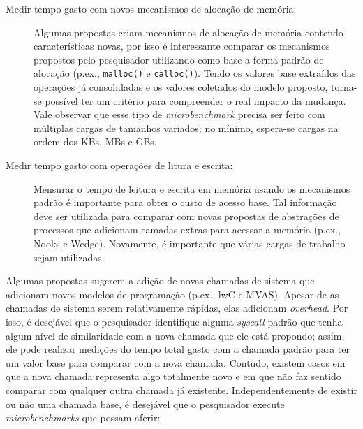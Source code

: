 \begin{description}

  \item[Medir tempo gasto com novos mecanismos de alocação de memória:]

Algumas propostas criam mecanismos de alocação de memória contendo
características novas, por isso é interessante comparar os mecanismos
propostos pelo pesquisador utilizando como base a forma padrão de alocação
(p.ex., \texttt{malloc()} e \texttt{calloc()}). Tendo os valores base extraídos
das operações já consolidadas e os valores coletados do modelo proposto,
torna-se possível ter um critério para compreender o real impacto da mudança.
Vale observar que esse tipo de \emph{microbenchmark} precisa ser feito com
múltiplas cargas de tamanhos variados; no mínimo, espera-se cargas na ordem dos
KBs, MBs e GBs.

  \item[Medir tempo gasto com operações de litura e escrita:]

Mensurar o tempo de leitura e escrita em memória usando os mecanismos
padrão é importante para obter o custo de acesso base. Tal informação deve ser
utilizada para comparar com novas propostas de abstrações de processos que
adicionam camadas extras para acessar a memória (p.ex., Nooks e Wedge).
Novamente, é importante que várias cargas de trabalho sejam utilizadas.

\end{description}

Algumas propostas sugerem a adição de novas chamadas de sistema que adicionam
novos modelos de programação (p.ex., lwC e MVAS). Apesar de as chamadas de sistema
serem relativamente rápidas, elas adicionam \emph{overhead}. Por isso, é
desejável que o pesquisador identifique alguma \emph{syscall} padrão que tenha
algum nível de similaridade com a nova chamada que ele está propondo; assim, ele
pode realizar medições do tempo total gasto com a chamada padrão para ter um valor
base para comparar com a nova chamada. Contudo, existem casos em que a nova
chamada representa algo totalmente novo e em que não faz sentido comparar com
qualquer outra chamada já existente. Independentemente de existir ou não uma
chamada base, é desejável que o pesquisador execute \emph{microbenchmarks} que
possam aferir:


